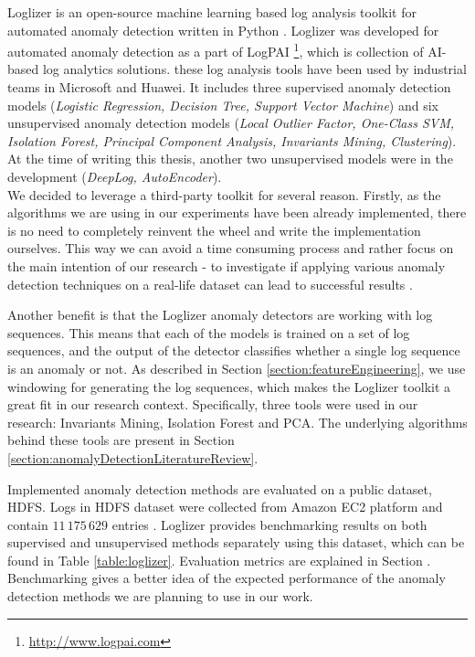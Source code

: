 Loglizer is an open-source machine learning based log analysis toolkit for automated anomaly detection written in Python \cite{he2016}. Loglizer was developed for automated anomaly detection as a part of LogPAI \footnote{\url{http://www.logpai.com}}, which is collection of AI-based log analytics solutions. these log analysis tools have been used by industrial teams in Microsoft and Huawei. It includes three supervised anomaly detection models (\textit{Logistic Regression, Decision Tree, Support Vector Machine}) and six unsupervised anomaly detection models (\textit{Local Outlier Factor, One-Class SVM, Isolation Forest, Principal Component Analysis, Invariants Mining, Clustering}). At the time of writing this thesis, another two unsupervised models were in the development (\textit{DeepLog, AutoEncoder}). \\

We decided to leverage a third-party toolkit for several reason. Firstly, as the algorithms we are using in our experiments have been already implemented, there is no need to completely reinvent the wheel and write the implementation ourselves. This way we can avoid a time consuming process and rather focus on the main intention of our research - to investigate if applying various anomaly detection techniques on a real-life dataset can lead to successful results .

Another benefit is that the Loglizer anomaly detectors are working with log sequences. This means that each of the models is trained on a set of log sequences, and the output of the detector classifies whether a single log sequence is an anomaly or not. As described in Section \ref{section:featureEngineering}, we use windowing for generating the log sequences, which makes the Loglizer toolkit a great fit in our research context. Specifically, three  tools were used in our research: Invariants Mining, Isolation Forest and PCA. The underlying algorithms behind these tools are present in Section \ref{section:anomalyDetectionLiteratureReview}.

Implemented anomaly detection methods are evaluated on a public dataset, HDFS. Logs in HDFS dataset were collected from Amazon EC2 platform and contain $11\,175\,629$ entries \cite{xu2009}. Loglizer provides benchmarking results on both supervised and unsupervised methods separately using this dataset, which can be found in Table \ref{table:loglizer}. Evaluation metrics are explained in Section . Benchmarking gives a better idea of the expected performance of the anomaly detection methods we are planning to use in our work. 

